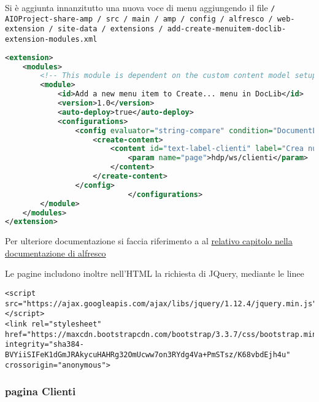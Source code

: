 Si è aggiunta innanzitutto una nuova voce di menu aggiungendo il file \texttt{/ AIOProject-share-amp / src / main / amp / config / alfresco / web-extension / site-data / extensions / add-create-menuitem-doclib-extension-modules.xml}
\begin{lstlisting}[language=XML]
<extension>
    <modules>
        <!-- This module is dependent on the custom content model setup in the repo-amp module -->
        <module>
            <id>Add a new menu item to Create... menu in DocLib</id>
            <version>1.0</version>
            <auto-deploy>true</auto-deploy>
            <configurations>
                <config evaluator="string-compare" condition="DocumentLibrary">
                    <create-content>
                        <content id="text-label-clienti" label="Crea nuovo cliente" icon="text" type="pagelink">
                            <param name="page">hdp/ws/clienti</param>
                        </content>
                    </create-content>
                </config>
                            </configurations>
        </module>
    </modules>
</extension>
\end{lstlisting}

Per ulteriore documentazione si faccia riferimento a al \href{http://docs.alfresco.com/5.0/tasks/dev-extensions-share-tutorials-add-menuitem-create-menu.html}{relativo capitolo nella documentazione di alfresco}

Le pagine includono inoltre nell’HTML la richiesta di JQuery, mediante le linee
\begin{lstlisting}
<script src="https://ajax.googleapis.com/ajax/libs/jquery/1.12.4/jquery.min.js"></script>
<link rel="stylesheet" href="https://maxcdn.bootstrapcdn.com/bootstrap/3.3.7/css/bootstrap.min.css" integrity="sha384-BVYiiSIFeK1dGmJRAkycuHAHRg32OmUcww7on3RYdg4Va+PmSTsz/K68vbdEjh4u" crossorigin="anonymous">
\end{lstlisting}

\subsubsection{pagina Clienti}

